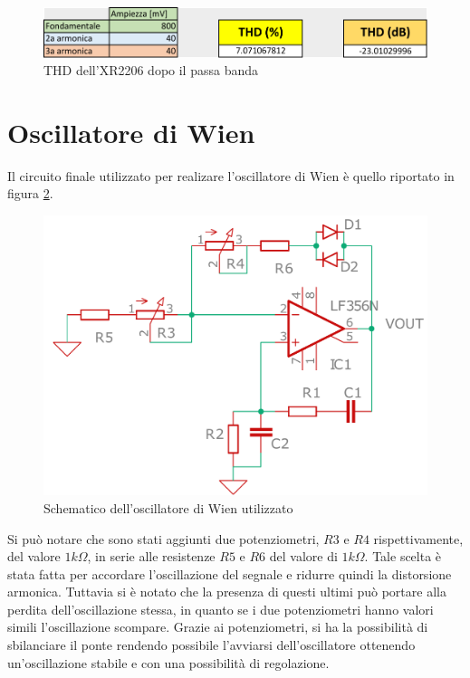 \documentclass[titlepage]{report}
\begin{document}
	\begin{figure}[H]
		\centering
		\includegraphics[scale =1]{Immagini/thd_xr+bp.pdf}
		\caption{THD dell'XR2206 dopo il passa banda}
		\label{fig:THDXR+BP}
	\end{figure}

\section{Oscillatore di Wien}

Il circuito finale utilizzato per realizare l'oscillatore di Wien è quello riportato in figura \ref{sch:osc_wien}.

\begin{figure}[H]
	\centering
	\includegraphics[scale=0.5]{Immagini/sch_osc_wien_cad.pdf}
	\caption{Schematico dell'oscillatore di Wien utilizzato}
	\label{sch:osc_wien}
\end{figure}

Si può notare che sono stati aggiunti due potenziometri, $R3$ e $R4$ rispettivamente, del valore  $1k\Omega$,  in serie alle resistenze $R5$ e $R6$ del valore di  $1k\Omega$. Tale scelta è stata fatta per accordare l'oscillazione del segnale e ridurre quindi la distorsione armonica. Tuttavia si è notato che la presenza di questi ultimi può portare alla perdita dell'oscillazione stessa, in quanto se i due potenziometri hanno valori simili l'oscillazione scompare. Grazie ai potenziometri, si ha la possibilità di sbilanciare il ponte rendendo possibile l'avviarsi dell'oscillatore ottenendo un'oscillazione stabile e con una possibilità di regolazione.
\end{document}

